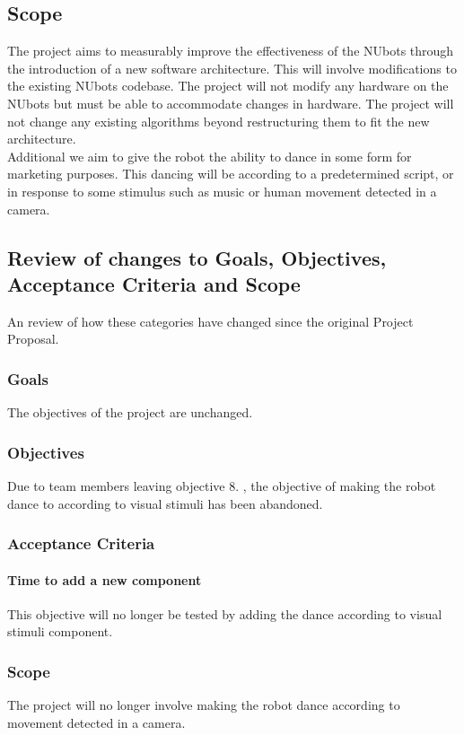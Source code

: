 \documentclass[a4paper]{article}
\begin{document}
		\subsection {Scope}
			The project aims to measurably improve the effectiveness of the NUbots through the introduction of a new software architecture. This will involve modifications to the existing NUbots codebase. The project will not modify any hardware on the NUbots but must be able to accommodate changes in hardware. The project will not change any existing algorithms beyond restructuring them to fit the new architecture.
			\\Additional we aim to give the robot the ability to dance in some form for marketing purposes. This dancing will be according to a predetermined script, or in response to some stimulus such as music or human movement detected in a camera.
				
		\subsection {Review of changes to Goals, Objectives, Acceptance Criteria and Scope}
			An review of how these categories have changed since the original Project Proposal.
			\subsubsection{Goals}
				The objectives of the project are unchanged.
			\subsubsection{Objectives}
				 Due to team members leaving objective 8. , the objective of making the robot dance to according to visual stimuli has been abandoned.
			\subsubsection{Acceptance Criteria}
				\paragraph{Time to add a new component}
					This objective will no longer be tested by adding the dance according to visual stimuli component.
			\subsubsection{Scope}
	The project will no longer involve making the robot dance according to movement detected in a camera.
\end{document}
